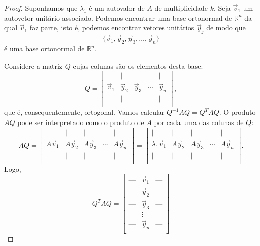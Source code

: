 \begin{proof}
	Suponhamos que $\lambda_1$ é um autovalor de $A$ de multiplicidade $k$. Seja $\vec{v}_1$ um autovetor unitário associado. Podemos encontrar uma base ortonormal de $\mathbb{R}^n$ da qual $\vec{v}_1$ faz parte, isto é, podemos encontrar vetores unitários $\vec{y}_j$ de modo que
	\begin{equation}
	\{ \vec{v}_1, \vec{y}_2, \vec{y}_3, \dots, \vec{y}_n \}
	\end{equation} é uma base ortonormal de $\mathbb{R}^n$.

	Considere a matriz $Q$ cujas colunas são os elementos desta base:
	\begin{equation}
	Q =
	\begin{bmatrix}
	| & | & | & & | \\
	\vec{v}_1 & \vec{y}_2 & \vec{y}_3 & \cdots &  \vec{y}_n \\
	| & | & | & & | \\
	\end{bmatrix},
	\end{equation} que é, consequentemente, ortogonal. Vamos calcular $Q^{-1} A Q = Q^T A Q$. O produto $AQ$ pode ser interpretado como o produto de $A$ por cada uma das colunas de $Q$:
	\begin{equation}
	AQ =
	\begin{bmatrix}
	| & | & | & & | \\
	A \vec{v}_1 & A \vec{y}_2 & A \vec{y}_3 & \cdots &  A\vec{y}_n \\
	| & | & | & & | \\
	\end{bmatrix} =
	\begin{bmatrix}
	| & | & | & & | \\
	\lambda_1 \vec{v}_1 & A \vec{y}_2 & A \vec{y}_3 & \cdots &  A\vec{y}_n \\
	| & | & | & & | \\
	\end{bmatrix}.
	\end{equation} Logo,
	\begin{equation}
	Q^TAQ =
	\begin{bmatrix}
	\text{---} & \vec{v}_1 & \text{---} \\
	\text{---} & \vec{y}_2 & \text{---} \\
	\text{---} & \vec{y}_3 &\text{---} \\
	& \vdots    &     \\
	\text{---} & \vec{y}_n & \text{---} \\
	\end{bmatrix}

\end{equation}
\end{proof}
